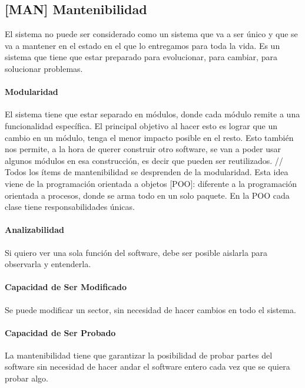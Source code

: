 \hypertarget{mantenibilidad-man}{%
\subsection{%
{[}MAN{]}
Mantenibilidad
}\label{mantenibilidad-man}}

El sistema no puede ser considerado como un sistema que va a ser único y
que se va a mantener en el estado en el que lo entregamos para toda la
vida. Es un sistema que tiene que estar preparado para evolucionar, para
cambiar, para solucionar problemas.

\hypertarget{modularidad}{%
\paragraph{Modularidad}\label{modularidad}}
El sistema tiene que estar separado en módulos,
  donde cada módulo remite a una funcionalidad específica. El principal
  objetivo al hacer esto es lograr que un cambio en un módulo, tenga el
  menor impacto posible en el resto. Esto también nos permite, a la hora
  de querer construir otro software, se van a poder usar algunos módulos
  en esa construcción, es decir que pueden ser reutilizados. // Todos
  los ítems de mantenibilidad se desprenden de la modularidad. Esta idea
  viene de la programación orientada a objetos {[}POO{]}: diferente a la
  programación orientada a procesos, donde se arma todo en un solo
  paquete. En la POO cada clase tiene responsabilidades únicas.

\hypertarget{analizabilidad}{%
\paragraph{Analizabilidad}\label{analizabilidad}}
Si quiero ver una sola función del software,
  debe ser posible aislarla para observarla y entenderla.

\hypertarget{modificable}{%
\paragraph{Capacidad de Ser Modificado}\label{modificable}}
Se puede modificar un sector,
  sin necesidad de hacer cambios en todo el sistema.

\hypertarget{testeable}{%
\paragraph{Capacidad de Ser Probado}\label{testeable}}
La mantenibilidad tiene que
  garantizar la posibilidad de probar partes del software sin necesidad
  de hacer andar el software entero cada vez que se quiera probar algo.


